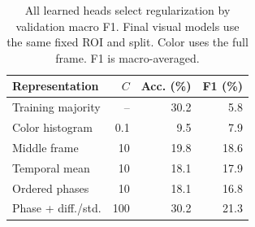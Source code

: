 \begin{table}[t]
\centering\small
\begin{tabular}{lrrr}
\toprule
Representation & $C$ & Acc. (\%) & F1 (\%) \\
\midrule
Training majority & -- & 30.2 & 5.8 \\
Color histogram & 0.1 & 9.5 & 7.9 \\
Middle frame & 10 & 19.8 & 18.6 \\
Temporal mean & 10 & 18.1 & 17.9 \\
Ordered phases & 10 & 18.1 & 16.8 \\
Phase + diff./std. & 100 & 30.2 & 21.3 \\
\bottomrule
\end{tabular}
\caption{All learned heads select regularization by validation macro F1. Final visual models use the same fixed ROI and split. Color uses the full frame. F1 is macro-averaged.}
\label{tab:results}
\end{table}
